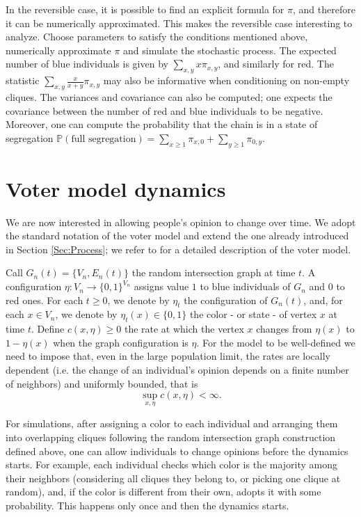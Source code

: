 \documentclass{article}
\theoremstyle{remark}
\newtheorem*{partial proof}{Partial proof of the Conjecture}
\begin{document}
In the reversible case, it is possible to find an explicit formula for $\pi$, and therefore it can be numerically approximated. This makes the reversible case interesting to analyze. Choose parameters to satisfy the conditions mentioned above, numerically approximate $\pi$ and simulate the stochastic process. The expected number of blue individuals is given by $\sum_{x,y}x\pi_{x,y}$, and similarly for red. The statistic $\sum_{x,y} \frac{x}{x+y}\pi_{x,y}$ may also be informative when conditioning on non-empty cliques. The variances and covariance can also be computed; one expects the covariance between the number of red and blue individuals to be negative. Moreover, one can compute the probability that the chain is in a state of segregation $\mathbb{P}(\text{full segregation})= \sum_{x \geq 1}\pi_{x,0} + \sum_{y\geq 1}\pi_{0,y}$.


\section{Voter model dynamics}
We are now interested in allowing people's opinion to change over time. We adopt the standard notation of the voter model and extend the one already introduced in Section \ref{Sec:Process}; we refer to \cite{liggett1985interacting} for a detailed description of the voter model.


Call $G_n(t)=\{V_n,E_n(t)\}$ the random intersection graph at time $t$. A configuration $\eta: V_n \to \{0,1\}^{V_n}$ assigns value $1$ to blue individuals of $G_n$ and $0$ to red ones. For each $t\geq 0$, we denote by $\eta_t$ the configuration of $G_n(t)$, and, for each $x \in V_n$, we denote by $\eta_t(x) \in \{0,1\}$ the color - or state - of vertex $x$ at time $t$. Define $c(x,\eta)\geq 0$ the rate at which the vertex $x$ changes from $\eta(x)$ to $1-\eta(x)$ when the graph configuration is $\eta$. For the model to be well-defined we need to impose that, even in the large population limit, the rates are locally dependent (i.e. the change of an individual's opinion depends on a finite number of neighbors) and uniformly bounded, that is
$$
\sup_{x,\eta} c(x,\eta)<\infty.
$$

For simulations, after assigning a color to each individual and arranging them into overlapping cliques following the random intersection graph construction defined above, one can allow individuals to change opinions before the dynamics starts. For example, each individual checks which color is the majority among their neighbors (considering all cliques they belong to, or picking one clique at random), and, if the color is different from their own, adopts it with some probability. This happens only once and then the dynamics starts.





\end{document}
